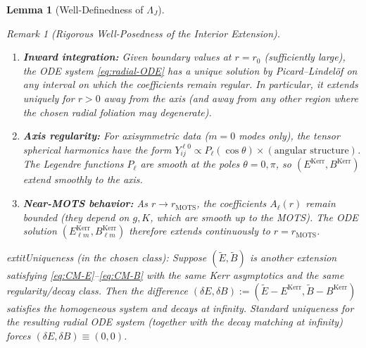 \documentclass[12pt]{article}
\theoremstyle{plain}
\newtheorem{lemma}[theorem]{Lemma}
\theoremstyle{definition}
\theoremstyle{remark}
\newtheorem{remark}[theorem]{Remark}
\begin{document}
\begin{lemma}[Well-Definedness of $\Lambda_J$]
\begin{remark}[Rigorous Well-Posedness of the Interior Extension]
\begin{enumerate}[label=(\alph*)]
    \item \textbf{Inward integration:} Given boundary values at $r = r_0$ (sufficiently large), the ODE system \eqref{eq:radial-ODE} has a unique solution by Picard--Lindel\"of on any interval on which the coefficients remain regular. In particular, it extends uniquely for $r>0$ away from the axis (and away from any other region where the chosen radial foliation may degenerate).
    
    \item \textbf{Axis regularity:} For axisymmetric data ($m = 0$ modes only), the tensor spherical harmonics have the form $Y^{\ell 0}_{ij} \propto P_\ell(\cos\theta) \times (\text{angular structure})$. The Legendre functions $P_\ell$ are smooth at the poles $\theta = 0, \pi$, so $(E^{\mathrm{Kerr}}, B^{\mathrm{Kerr}})$ extend smoothly to the axis.
    
    \item \textbf{Near-MOTS behavior:} As $r \to r_{\mathrm{MOTS}}$, the coefficients $A_\ell(r)$ remain bounded (they depend on $g, K$, which are smooth up to the MOTS). The ODE solution $(E^{\mathrm{Kerr}}_{\ell m}, B^{\mathrm{Kerr}}_{\ell m})$ therefore extends continuously to $r = r_{\mathrm{MOTS}}$.
\end{enumerate}

	extit{Uniqueness (in the chosen class):} Suppose $(\tilde{E}, \tilde{B})$ is another extension satisfying \eqref{eq:CM-E}--\eqref{eq:CM-B} with the same Kerr asymptotics and the same regularity/decay class. Then the difference $(\delta E, \delta B) := (\tilde{E} - E^{\mathrm{Kerr}}, \tilde{B} - B^{\mathrm{Kerr}})$ satisfies the homogeneous system and decays at infinity. Standard uniqueness for the resulting radial ODE system (together with the decay matching at infinity) forces $(\delta E, \delta B) \equiv (0,0)$.


\end{remark}
\end{lemma}
\end{document}
